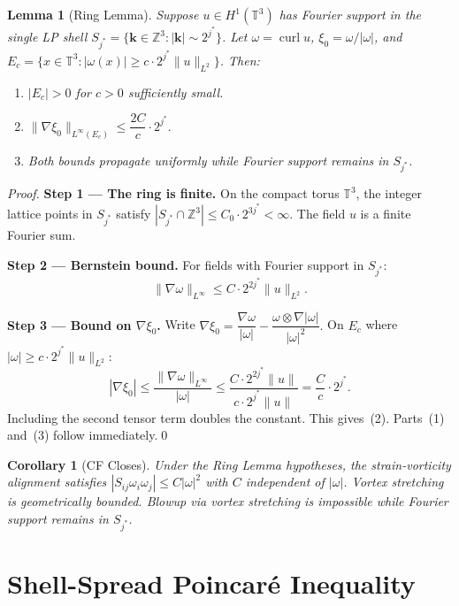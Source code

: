 \documentclass[11pt]{article}
\newtheorem{lemma}[theorem]{Lemma}
\newtheorem{corollary}[theorem]{Corollary}
\begin{document}
\begin{lemma}[Ring Lemma]\label{lem:ring}
Suppose $u\in H^1(\mathbb{T}^3)$ has Fourier support in the single LP shell
$S_{j^*} = \{\mathbf{k}\in\mathbb{Z}^3: |\mathbf{k}|\sim 2^{j^*}\}$.
Let $\omega = \operatorname{curl} u$, $\xi_0 = \omega/|\omega|$, and
$E_c = \{x\in\mathbb{T}^3: |\omega(x)|\geq c\cdot 2^{j^*}\|u\|_{L^2}\}$.
Then:
\begin{enumerate}
\item $|E_c|>0$ for $c>0$ sufficiently small.
\item $\|\nabla\xi_0\|_{L^\infty(E_c)} \leq \dfrac{2C}{c}\cdot 2^{j^*}.$
\item Both bounds propagate uniformly while Fourier support remains in $S_{j^*}$.
\end{enumerate}
\end{lemma}

\begin{proof}
\textbf{Step 1 --- The ring is finite.}
On the compact torus $\mathbb{T}^3$, the integer lattice points in $S_{j^*}$ satisfy
$|S_{j^*}\cap\mathbb{Z}^3|\leq C_0\cdot 2^{3j^*}<\infty$. The field $u$ is a finite Fourier sum.

\textbf{Step 2 --- Bernstein bound.}
For fields with Fourier support in $S_{j^*}$:
\[
\|\nabla\omega\|_{L^\infty} \leq C\cdot 2^{2j^*}\|u\|_{L^2}.
\]

\textbf{Step 3 --- Bound on $\nabla\xi_0$.}
Write
$\nabla\xi_0 = \dfrac{\nabla\omega}{|\omega|} - \dfrac{\omega\otimes\nabla|\omega|}{|\omega|^2}.$
On $E_c$ where $|\omega|\geq c\cdot 2^{j^*}\|u\|_{L^2}$:
\[
|\nabla\xi_0| \leq \frac{\|\nabla\omega\|_{L^\infty}}{|\omega|}
\leq \frac{C\cdot 2^{2j^*}\|u\|}{c\cdot 2^{j^*}\|u\|} = \frac{C}{c}\cdot 2^{j^*}.
\]
Including the second tensor term doubles the constant. This gives~(2).
Parts~(1) and~(3) follow immediately.\qed
\end{proof}

\begin{corollary}[CF Closes]\label{cor:CF}
Under the Ring Lemma hypotheses, the strain-vorticity alignment satisfies
$|S_{ij}\omega_i\omega_j|\leq C|\omega|^2$ with $C$ independent of $|\omega|$.
Vortex stretching is geometrically bounded. Blowup via vortex stretching is impossible while
Fourier support remains in $S_{j^*}$.
\end{corollary}

\section{Shell-Spread Poincar\'e Inequality}
\end{document}
